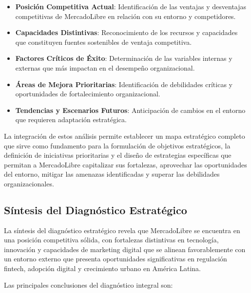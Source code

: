 \begin{itemize}
\item \textbf{Posición Competitiva Actual}: Identificación de las ventajas y desventajas competitivas de MercadoLibre en relación con su entorno y competidores.
\item \textbf{Capacidades Distintivas}: Reconocimiento de los recursos y capacidades que constituyen fuentes sostenibles de ventaja competitiva.
\item \textbf{Factores Críticos de Éxito}: Determinación de las variables internas y externas que más impactan en el desempeño organizacional.
\item \textbf{Áreas de Mejora Prioritarias}: Identificación de debilidades críticas y oportunidades de fortalecimiento organizacional.
\item \textbf{Tendencias y Escenarios Futuros}: Anticipación de cambios en el entorno que requieren adaptación estratégica.
\end{itemize}

La integración de estos análisis permite establecer un mapa estratégico completo que sirve como fundamento para la formulación de objetivos estratégicos, la definición de iniciativas prioritarias y el diseño de estrategias específicas que permitan a MercadoLibre capitalizar sus fortalezas, aprovechar las oportunidades del entorno, mitigar las amenazas identificadas y superar las debilidades organizacionales.





\subsection{Síntesis del Diagnóstico Estratégico}

La síntesis del diagnóstico estratégico revela que MercadoLibre se encuentra en una posición competitiva sólida, con fortalezas distintivas en tecnología, innovación y capacidades de marketing digital que se alinean favorablemente con un entorno externo que presenta oportunidades significativas en regulación fintech, adopción digital y crecimiento urbano en América Latina.

Las principales conclusiones del diagnóstico integral son:

